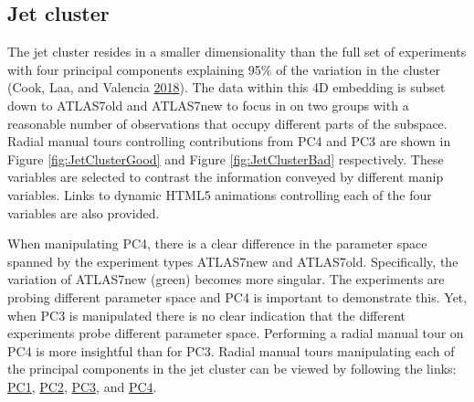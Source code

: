 \hypertarget{jet-cluster}{%
\subsection{Jet cluster}\label{jet-cluster}}

The jet cluster resides in a smaller dimensionality than the full set of
experiments with four principal components explaining 95\% of the
variation in the cluster (Cook, Laa, and Valencia
\protect\hyperlink{ref-cook_dynamical_2018}{2018}). The data within this
4D embedding is subset down to ATLAS7old and ATLAS7new to focus in on
two groups with a reasonable number of observations that occupy
different parts of the subspace. Radial manual tours controlling
contributions from PC4 and PC3 are shown in Figure
\ref{fig:JetClusterGood} and Figure \ref{fig:JetClusterBad}
respectively. These variables are selected to contrast the information
conveyed by different manip variables. Links to dynamic HTML5 animations
controlling each of the four variables are also provided.

When manipulating PC4, there is a clear difference in the parameter
space spanned by the experiment types ATLAS7new and ATLAS7old.
Specifically, the variation of ATLAS7new (green) becomes more singular.
The experiments are probing different parameter space and PC4 is
important to demonstrate this. Yet, when PC3 is manipulated there is no
clear indication that the different experiments probe different
parameter space. Performing a radial manual tour on PC4 is more
insightful than for PC3. Radial manual tours manipulating each of the
principal components in the jet cluster can be viewed by following the
links:
\href{https://nspyrison.netlify.com/thesis/jetcluster_manualtour_pc1/}{PC1},
\href{https://nspyrison.netlify.com/thesis/jetcluster_manualtour_pc2/}{PC2},
\href{https://nspyrison.netlify.com/thesis/jetcluster_manualtour_pc3/}{PC3},
and
\href{https://nspyrison.netlify.com/thesis/jetcluster_manualtour_pc4/}{PC4}.

